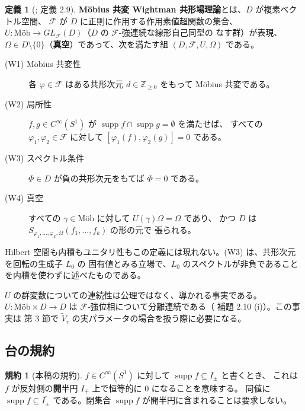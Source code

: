 \documentclass[11pt,a4paper]{article}
\newcommand{\Mob}{\mathrm{M\text{ö}b}}
\newcommand{\Circ}{S^{1}}
\newcommand{\Fields}{\mathcal{F}}
\newcommand{\Vt}{\widetilde{V}}
\newcommand{\Dom}{D}
\theoremstyle{definition}
\newtheorem{definition}[theorem]{定義}
\newtheorem{convention}[theorem]{規約}
\newcommand{\srcnum}[1]{\renewcommand{\thetheorem}{#1}}
\begin{document}
\srcnum{2.5}
\begin{definition}[\cite{T26}; \cite{CRTT25} 定義 2.9]
\label{def:wightman}
\textbf{M\"obius 共変 Wightman 共形場理論}とは、$\Dom$ が複素ベクトル空間、
$\Fields$ が $\Dom$ に正則に作用する作用素値超関数の集合、
$U : \Mob \to GL_{\Fields}(\Dom)$（$\Dom$ の $\Fields$-強連続な線形自己同型の
なす群）が表現、
$\Omega \in \Dom \setminus \{0\}$（\textbf{真空}）であって、次を満たす組
$(\Dom, \Fields, U, \Omega)$ である。
\begin{description}
  \item[(W1) M\"obius 共変性] 各 $\varphi \in \Fields$ はある共形次元
    $d \in \mathbb{Z}_{\ge 0}$ をもって M\"obius 共変である。
  \item[(W2) 局所性] $f, g \in C^\infty(\Circ)$ が
    $\operatorname{supp} f \cap \operatorname{supp} g = \emptyset$ を満たせば、
    すべての $\varphi_1, \varphi_2 \in \Fields$ に対して
    $[\varphi_1(f), \varphi_2(g)] = 0$ である。
  \item[(W3) スペクトル条件] $\Phi \in \Dom$ が負の共形次元をもてば $\Phi = 0$ である。
  \item[(W4) 真空] すべての $\gamma \in \Mob$ に対して $U(\gamma)\Omega = \Omega$ であり、
    かつ $\Dom$ は $S_{\varphi_1,\dots,\varphi_k,\Omega}(f_1,\dots,f_k)$ の形の元で
    張られる。
\end{description}
\end{definition}

Hilbert 空間も内積もユニタリ性もこの定義には現れない。(W3) は、共形次元を回転の生成子 $L_0$ の
固有値とみる立場で、$L_0$ のスペクトルが非負であることを内積を使わずに述べたものである。

$U$ の群変数についての連続性は公理ではなく、導かれる事実である。$U : \Mob \times \Dom \to \Dom$
は $\Fields$-強位相について分離連続である（\cite{CRTT25} 補題 2.10 (i)）。この事実は
第 3 節で $\Vt_\tau$ の実パラメータの場合を扱う際に必要になる。

\subsection{台の規約}

\srcnum{A}
\begin{convention}[本稿の規約]
\label{conv:supp}
$f \in C^\infty(\Circ)$ に対して $\operatorname{supp} f \subseteq I_\pm$ と書くとき、
これは $f$ が反対側の\textbf{開}半円 $I_\mp$ 上で恒等的に $0$ になることを意味する。
同値に $\operatorname{supp} f \subseteq \overline{I_\pm}$ である。閉集合
$\operatorname{supp} f$ が開半円に含まれることは要求しない。
\end{convention}
\end{document}
